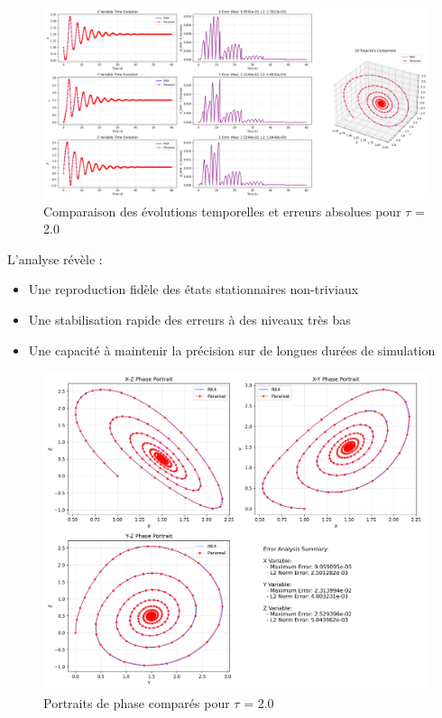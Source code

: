 \begin{figure}[H]
    \centering
    \includegraphics[width=\textwidth]{figures/comparisons/comparison_tau2.0_comparison}
    \caption{Comparaison des évolutions temporelles et erreurs absolues pour $\tau$ = 2.0}
    \label{fig:comp_tau2.0_time}
\end{figure}

L'analyse révèle :
\begin{itemize}
    \item Une reproduction fidèle des états stationnaires non-triviaux
    \item Une stabilisation rapide des erreurs à des niveaux très bas
    \item Une capacité à maintenir la précision sur de longues durées de simulation
\end{itemize}

\begin{figure}[H]
    \centering
    \includegraphics[width=\textwidth]{figures/comparisons/comparison_tau2.0_phase_portraits}
    \caption{Portraits de phase comparés pour $\tau$ = 2.0}
    \label{fig:comp_tau2.0_phase}
\end{figure}

